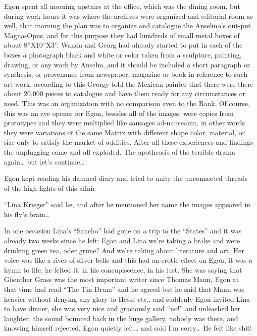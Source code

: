\documentclass[smalldemyvopaper,11pt,twoside,onecolumn,openright,extrafontsizes]{memoir}
\begin{document}
Egon spent  all morning upstairs at the office, which was the dining room, but during work hours it was where the archives were organized and editorial room as well, that morning the plan was to organize and catalogue the Anselmo’s out-put Magna-Opus, and for this purpose they had hundreds of small metal boxes of about 8”X10”X3”. Wanda and Georg had already started to put in each of the boxes a photograph black and white or color taken from a sculpture, painting, drawing, or any work by Anselm, and it should be included a short paragraph or synthesis, or provenance from newspaper, magazine or book in reference to such art work, according to this Georgy told the Mexican painter that there were there about 20,000 pieces to catalogue and have them ready for any circumstances or need. This was an organization with no comparison even to the Rank. Of course, this was an eye opener for Egon, besides all of the images, were copies from prototypes and they were multiplied like sausages ad-nauseaum, in other words they were variations of the same Matrix with different shape color, material, or size only to satisfy the market of oddities. After all these experiences and findings the unplugging came and all exploded. The apotheosis of the terrible drama again… but let’s continue…

Egon kept reading his damned diary and tried to unite the unconnected threads of the high lights of this affair.

“Lina Krieger” said he, and after he mentioned her name the images appeared in his fly’s brain…

In one occasion Lina’s “Sancho” had gone on a trip to the “States” and it was already two weeks since he left: Egon and Lina we're taking a brake and were drinking green tea, oder grüne? And we're taking about literature and art. Her voice was like a river of silver bells and this had an erotic effect on Egon, it was a hymn to life, he felted it, in his concupiscence, in his lust. She was saying that Güenther Grass was the most important writer since Thomas Mann, Egon at that time had read “The Tin Drum” and he agreed but he said that Mann was heavier without denying any glory to Hesse etc., and suddenly Egon invited Lina to have dinner, she was very nice and graciously said “no!”  and unleashed her laughter, the sound bounced back in the huge gallery, nobody was there, and knowing himself rejected, Egon quietly left… and said I’m sorry… He felt like shit!
\end{document}

